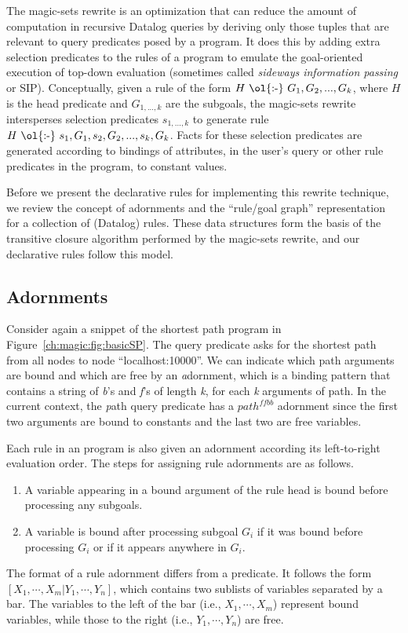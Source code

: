 The magic-sets rewrite is an optimization that can reduce the amount of
computation in recursive Datalog queries by deriving only those tuples that are
relevant to query predicates posed by a program.  It does this by adding extra
selection predicates to the rules of a program to emulate the goal-oriented
execution of top-down evaluation (sometimes called \emph{sideways information
passing} or SIP).  Conceptually, given a rule of the form $H\ \text{\ol{:-}}\
G_1, G_2, ..., G_k$, where $H$ is the head predicate and $G_{1,...,k}$ are the
subgoals, the magic-sets rewrite intersperses selection predicates
$s_{1,...,k}$ to generate rule $H\ \text{\ol{:-}}\ s_1, G_1, s_2, G_2, ...,
s_{k}, G_k$.  Facts for these selection predicates are generated according to
bindings of attributes, in the user's query or other rule predicates in the
program, to constant values.

Before we present the declarative rules for implementing this rewrite
technique, we review the concept of adornments and the ``rule/goal graph''
representation for a collection of \OVERLOG (Datalog) rules.  These data
structures form the basis of the transitive closure algorithm performed
by the magic-sets rewrite, and our declarative rules follow this model.


\subsection{Adornments}

Consider again a snippet of the shortest path program in
Figure~\ref{ch:magic:fig:basicSP}.  The query predicate \ol{path(@LOCALHOST,
``localhost:10000'', P, C)} asks for the shortest path from all nodes to node
``localhost:10000''.  We can indicate which path arguments are bound and which
are free by an {\emph adornment}, which is a binding pattern that contains a
string of {\emph b's} and {\emph f's} of length {\emph k}, for each {\emph k}
arguments of path.  In the current context, the {\emph path} query predicate
has a $path^{ffbb}$ adornment since the first two arguments are bound to
constants and the last two are free variables.

Each rule in an \OVERLOG program is also given an adornment according its
left-to-right evaluation order.  The steps for assigning rule adornments are as
follows.
\begin{enumerate}
    \ssp
    \item A variable appearing in a bound argument of the rule head is bound before processing any subgoals.
    \item A variable is bound after processing subgoal $G_i$ if it was bound 
          before processing $G_i$ or if it appears anywhere in $G_i$.
\end{enumerate}
The format of a rule adornment differs from a predicate.  It follows the form
$[X_1,\cdots,X_m|Y_1,\cdots,Y_n]$, which contains two sublists of variables
separated by a bar.  The variables to the left of the bar (i.e.,
$X_1,\cdots,X_m$) represent bound variables, while those to the right (i.e.,
$Y_1,\cdots,Y_n$) are free. 

